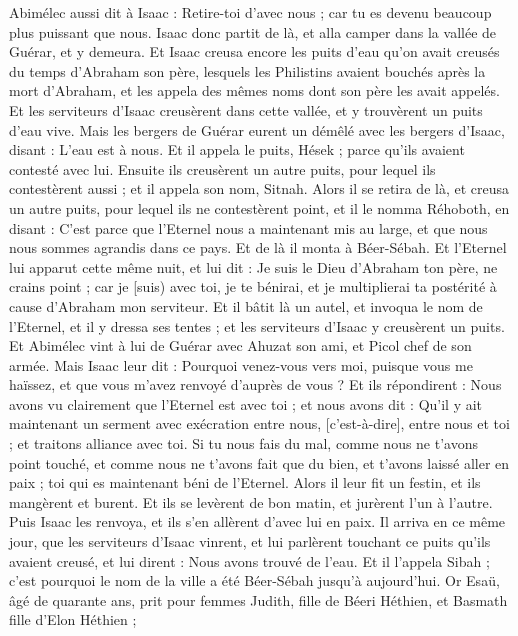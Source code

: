 \begin{multicols}{2}
Abimélec aussi dit à Isaac : Retire-toi d'avec nous ; car tu es devenu beaucoup plus puissant que nous.
Isaac donc partit de là, et alla camper dans la vallée de Guérar, et y demeura.
Et Isaac creusa encore les puits d'eau qu'on avait creusés du temps d'Abraham son père, lesquels les Philistins avaient bouchés après la mort d'Abraham, et les appela des mêmes noms dont son père les avait appelés.
Et les serviteurs d'Isaac creusèrent dans cette vallée, et y trouvèrent un puits d'eau vive.
Mais les bergers de Guérar eurent un démêlé avec les bergers d'Isaac, disant : L'eau est à nous. Et il appela le puits, Hések ; parce qu'ils avaient contesté avec lui.
Ensuite ils creusèrent un autre puits, pour lequel ils contestèrent aussi ; et il appela son nom, Sitnah.
Alors il se retira de là, et creusa un autre puits, pour lequel ils ne contestèrent point, et il le nomma Réhoboth, en disant : C'est parce que l'Eternel nous a maintenant mis au large, et que nous nous sommes agrandis dans ce pays.
Et de là il monta à Béer-Sébah.
Et l'Eternel lui apparut cette même nuit, et lui dit : Je suis le Dieu d'Abraham ton père, ne crains point ; car je [suis) avec toi, je te bénirai, et je multiplierai ta postérité à cause d'Abraham mon serviteur.
Et il bâtit là un autel, et invoqua le nom de l'Eternel, et il y dressa ses tentes ; et les serviteurs d'Isaac y creusèrent un puits.
Et Abimélec vint à lui de Guérar avec Ahuzat son ami, et Picol chef de son armée.
Mais Isaac leur dit : Pourquoi venez-vous vers moi, puisque vous me haïssez, et que vous m'avez renvoyé d'auprès de vous ?
Et ils répondirent : Nous avons vu clairement que l'Eternel est avec toi ; et nous avons dit : Qu'il y ait maintenant un serment avec exécration entre nous, [c'est-à-dire], entre nous et toi ; et traitons alliance avec toi.
Si tu nous fais du mal, comme nous ne t'avons point touché, et comme nous ne t'avons fait que du bien, et t'avons laissé aller en paix ; toi qui es maintenant béni de l'Eternel.
Alors il leur fit un festin, et ils mangèrent et burent.
Et ils se levèrent de bon matin, et jurèrent l'un à l'autre. Puis Isaac les renvoya, et ils s'en allèrent d'avec lui en paix.
Il arriva en ce même jour, que les serviteurs d'Isaac vinrent, et lui parlèrent touchant ce puits qu'ils avaient creusé, et lui dirent : Nous avons trouvé de l'eau.
Et il l'appela Sibah ; c'est pourquoi le nom de la ville a été Béer-Sébah jusqu'à aujourd'hui.
Or Esaü, âgé de quarante ans, prit pour femmes Judith, fille de Béeri Héthien, et Basmath fille d'Elon Héthien ;

\end{multicols}
